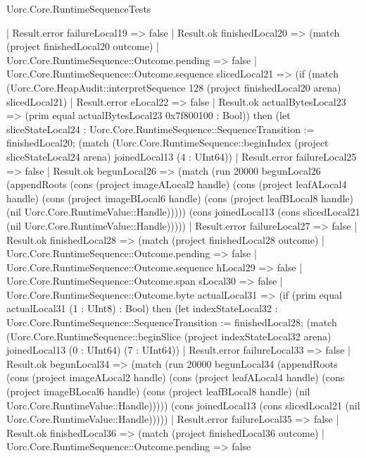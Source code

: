 \begin{lexlean}{Uorc.Core.RuntimeSequenceTests}
\begin{semanticmodule}
{                    | Result.error failureLocal19 => false
                    | Result.ok finishedLocal20 => (match (project finishedLocal20 outcome)
                      | Uorc.Core.RuntimeSequence::Outcome.pending => false
                      | Uorc.Core.RuntimeSequence::Outcome.sequence slicedLocal21 => (if (match (Uorc.Core.HeapAudit::interpretSequence 128 (project finishedLocal20 arena) slicedLocal21)
                        | Result.error eLocal22 => false
                        | Result.ok actualBytesLocal23 => (prim equal actualBytesLocal23 0x7f800100 : Bool)) then (let sliceStateLocal24 : Uorc.Core.RuntimeSequence::SequenceTransition := finishedLocal20; (match (Uorc.Core.RuntimeSequence::beginIndex (project sliceStateLocal24 arena) joinedLocal13 (4 : UInt64))
                        | Result.error failureLocal25 => false
                        | Result.ok begunLocal26 => (match (run 20000 begunLocal26 (appendRoots (cons (project imageALocal2 handle) (cons (project leafALocal4 handle) (cons (project imageBLocal6 handle) (cons (project leafBLocal8 handle) (nil Uorc.Core.RuntimeValue::Handle))))) (cons joinedLocal13 (cons slicedLocal21 (nil Uorc.Core.RuntimeValue::Handle)))))
                          | Result.error failureLocal27 => false
                          | Result.ok finishedLocal28 => (match (project finishedLocal28 outcome)
                            | Uorc.Core.RuntimeSequence::Outcome.pending => false
                            | Uorc.Core.RuntimeSequence::Outcome.sequence hLocal29 => false
                            | Uorc.Core.RuntimeSequence::Outcome.span sLocal30 => false
                            | Uorc.Core.RuntimeSequence::Outcome.byte actualLocal31 => (if (prim equal actualLocal31 (1 : UInt8) : Bool) then (let indexStateLocal32 : Uorc.Core.RuntimeSequence::SequenceTransition := finishedLocal28; (match (Uorc.Core.RuntimeSequence::beginSlice (project indexStateLocal32 arena) joinedLocal13 (0 : UInt64) (7 : UInt64))
                              | Result.error failureLocal33 => false
                              | Result.ok begunLocal34 => (match (run 20000 begunLocal34 (appendRoots (cons (project imageALocal2 handle) (cons (project leafALocal4 handle) (cons (project imageBLocal6 handle) (cons (project leafBLocal8 handle) (nil Uorc.Core.RuntimeValue::Handle))))) (cons joinedLocal13 (cons slicedLocal21 (nil Uorc.Core.RuntimeValue::Handle)))))
                                | Result.error failureLocal35 => false
                                | Result.ok finishedLocal36 => (match (project finishedLocal36 outcome)
                                  | Uorc.Core.RuntimeSequence::Outcome.pending => false
}
\end{semanticmodule}
\end{lexlean}
